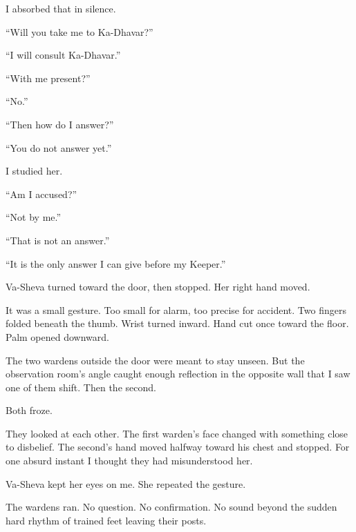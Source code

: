 I absorbed that in silence.\par

``Will you take me to Ka-Dhavar?''\par

``I will consult Ka-Dhavar.''\par

``With me present?''\par

``No.''\par

``Then how do I answer?''\par

``You do not answer yet.''\par

I studied her.\par

``Am I accused?''\par

``Not by me.''\par

``That is not an answer.''\par

``It is the only answer I can give before my Keeper.''\par

Va-Sheva turned toward the door, then stopped. Her right hand moved.\par

It was a small gesture. Too small for alarm, too precise for accident. Two fingers folded beneath the thumb. Wrist turned inward. Hand cut once toward the floor. Palm opened downward.\par

The two wardens outside the door were meant to stay unseen. But the observation room's angle caught enough reflection in the opposite wall that I saw one of them shift. Then the second.\par

Both froze.\par

They looked at each other. The first warden's face changed with something close to disbelief. The second's hand moved halfway toward his chest and stopped. For one absurd instant I thought they had misunderstood her.\par

Va-Sheva kept her eyes on me. She repeated the gesture.\par

The wardens ran. No question. No confirmation. No sound beyond the sudden hard rhythm of trained feet leaving their posts.\par


